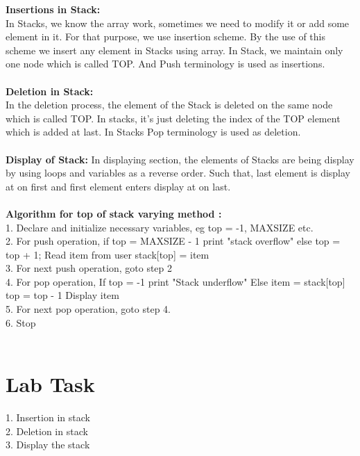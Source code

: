\documentclass[11pt]{article}            %
\begin{document}
\textbf{Insertions in Stack:  }\\ 
In Stacks, we know the array work, sometimes we need to modify it or add some element in it. For that purpose, we use insertion scheme. By the use of this scheme we insert any element in Stacks using array. In Stack, we maintain only one node which is called TOP. And Push terminology is used as insertions.   \\ \\
\textbf{Deletion in Stack: }\\
In the deletion process, the element of the Stack is deleted on the same node which is called TOP. In stacks, it’s just deleting the index of the TOP element which is added at last. In Stacks Pop terminology is used as deletion.\\ \\
\textbf{Display of Stack: }
In displaying section, the elements of Stacks are being display by using loops and variables as a reverse order. Such that, last element is display at on first and first element enters display at on last.\\ \\


\textbf{Algorithm for top of stack varying method : }\\
1. Declare and initialize necessary variables, eg top = -1,    MAXSIZE etc. \\
2. For push operation, if top = MAXSIZE - 1 print "stack overflow" else top = top + 1;  Read item from user stack[top] = item\\
3. For next push operation, goto step 2\\
4. For pop operation, If top = -1       print "Stack underflow" Else       item = stack[top]       top = top - 1       Display item\\
 5. For next pop operation, goto step 4. \\
6. Stop   \\ \\ 




\section{Lab Task }  
1. Insertion in stack \\
2. Deletion in stack \\
3. Display the stack\\ \\
\end{document}

